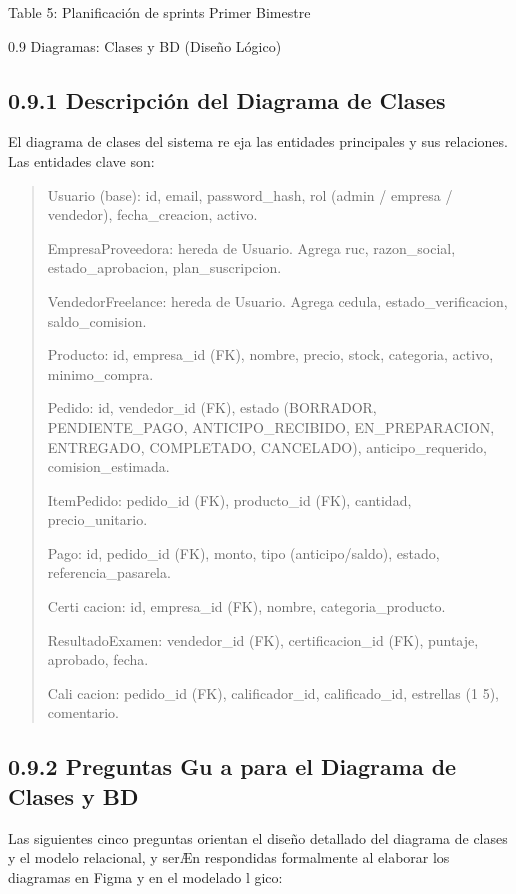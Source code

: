 \documentclass[
]{article}
\begin{document}
Table 5: Planificación de sprints Primer Bimestre

0.9 Diagramas: Clases y BD (Diseño Lógico)

\subsection{0.9.1 Descripción del Diagrama de
Clases}\label{descripciuxf3n-del-diagrama-de-clases}

El diagrama de clases del sistema re eja las entidades principales y sus
relaciones. Las entidades clave son:

\begin{quote}
Usuario (base): id, email, password\_hash, rol (admin / empresa /
vendedor), fecha\_creacion, activo.

EmpresaProveedora: hereda de Usuario. Agrega ruc, razon\_social,
estado\_aprobacion, plan\_suscripcion.

VendedorFreelance: hereda de Usuario. Agrega cedula,
estado\_verificacion, saldo\_comision.

Producto: id, empresa\_id (FK), nombre, precio, stock, categoria,
activo, minimo\_compra.

Pedido: id, vendedor\_id (FK), estado (BORRADOR, PENDIENTE\_PAGO,
ANTICIPO\_RECIBIDO, EN\_PREPARACION, ENTREGADO, COMPLETADO, CANCELADO),
anticipo\_requerido, comision\_estimada.

ItemPedido: pedido\_id (FK), producto\_id (FK), cantidad,
precio\_unitario.

Pago: id, pedido\_id (FK), monto, tipo (anticipo/saldo), estado,
referencia\_pasarela.

Certi cacion: id, empresa\_id (FK), nombre, categoria\_producto.

ResultadoExamen: vendedor\_id (FK), certificacion\_id (FK), puntaje,
aprobado, fecha.

Cali cacion: pedido\_id (FK), calificador\_id, calificado\_id, estrellas
(1 5), comentario.
\end{quote}

\subsection{0.9.2 Preguntas Gu a para el Diagrama de Clases y
BD}\label{preguntas-gu-a-para-el-diagrama-de-clases-y-bd}

Las siguientes cinco preguntas orientan el diseño detallado del diagrama
de clases y el modelo relacional, y serÆn respondidas formalmente al
elaborar los diagramas en Figma y en el modelado l gico:
\end{document}
